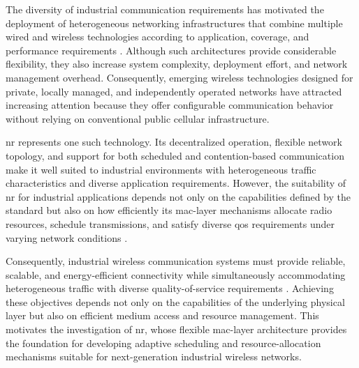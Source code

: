 \documentclass[12pt,a4paper]{article}
\begin{document}
The diversity of industrial communication requirements has motivated the deployment of heterogeneous networking infrastructures that combine multiple wired and wireless technologies according to application, coverage, and performance requirements \cite{alizaiHeterogeneousCommunicationNetworks2023a,karrenbauerFutureIndustrialNetworking2019a,aschenbrennerFlexiCell5GLocationbased2022a}. Although such architectures provide considerable flexibility, they also increase system complexity, deployment effort, and network management overhead. Consequently, emerging wireless technologies designed for private, locally managed, and independently operated networks have attracted increasing attention because they offer configurable communication behavior without relying on conventional public cellular infrastructure.

\gls{nr} represents one such technology. Its decentralized operation, flexible network topology, and support for both scheduled and contention-based communication make it well suited to industrial environments with heterogeneous traffic characteristics and diverse application requirements. However, the suitability of \gls{nr} for industrial applications depends not only on the capabilities defined by the standard but also on how efficiently its \gls{mac}-layer mechanisms allocate radio resources, schedule transmissions, and satisfy diverse \gls{qos} requirements under varying network conditions \cite{etsi_ts103636_1,etsi_ts103636_4,perez-guiraoDECTNRUnveiling2022,kovalchukovDECT2020NewRadio2022,poetsDECTNRNew2024}.

Consequently, industrial wireless communication systems must provide reliable, scalable, and energy-efficient connectivity while simultaneously accommodating heterogeneous traffic with diverse quality-of-service requirements \cite{willigWirelessTechnologyIndustrial2005,vitturiIndustrialWirelessNetworks2013,wollschlaegerFutureIndustrialCommunication2017a}. Achieving these objectives depends not only on the capabilities of the underlying physical layer but also on efficient medium access and resource management. This motivates the investigation of \gls{nr}, whose flexible \gls{mac}-layer architecture provides the foundation for developing adaptive scheduling and resource-allocation mechanisms suitable for next-generation industrial wireless networks.
\end{document}
